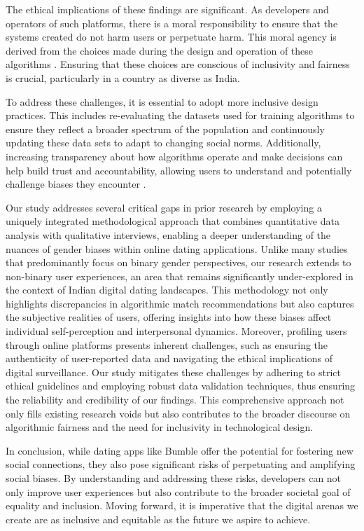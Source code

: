The ethical implications of these findings are significant. As developers and operators of such platforms, there is a moral responsibility to ensure that the systems created do not harm users or perpetuate harm. This moral agency is derived from the choices made during the design and operation of these algorithms \cite{Mittelstadt_2016}. Ensuring that these choices are conscious of inclusivity and fairness is crucial, particularly in a country as diverse as India.

To address these challenges, it is essential to adopt more inclusive design practices. This includes re-evaluating the datasets used for training algorithms to ensure they reflect a broader spectrum of the population and continuously updating these data sets to adapt to changing social norms. Additionally, increasing transparency about how algorithms operate and make decisions can help build trust and accountability, allowing users to understand and potentially challenge biases they encounter \cite{Linden_2020}.

Our study addresses several critical gaps in prior research by employing a uniquely integrated methodological approach that combines quantitative data analysis with qualitative interviews, enabling a deeper understanding of the nuances of gender biases within online dating applications. Unlike many studies that predominantly focus on binary gender perspectives, our research extends to non-binary user experiences, an area that remains significantly under-explored in the context of Indian digital dating landscapes. This methodology not only highlights discrepancies in algorithmic match recommendations but also captures the subjective realities of users, offering insights into how these biases affect individual self-perception and interpersonal dynamics. Moreover, profiling users through online platforms presents inherent challenges, such as ensuring the authenticity of user-reported data and navigating the ethical implications of digital surveillance. Our study mitigates these challenges by adhering to strict ethical guidelines and employing robust data validation techniques, thus ensuring the reliability and credibility of our findings. This comprehensive approach not only fills existing research voids but also contributes to the broader discourse on algorithmic fairness and the need for inclusivity in technological design.

In conclusion, while dating apps like Bumble offer the potential for fostering new social connections, they also pose significant risks of perpetuating and amplifying social biases. By understanding and addressing these risks, developers can not only improve user experiences but also contribute to the broader societal goal of equality and inclusion. Moving forward, it is imperative that the digital arenas we create are as inclusive and equitable as the future we aspire to achieve.
